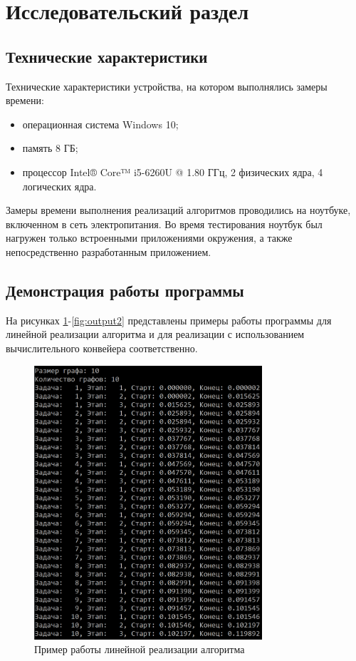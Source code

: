 \section{Исследовательский раздел \hfill}
\vspace{\baselineskip}


\subsection{Технические характеристики}

Технические характеристики устройства, на котором выполнялись замеры времени:

\begin{itemize}[label=---]
	\item операционная система Windows 10;
	\item память 8 ГБ;
	\item процессор Intel® Core™ i5-6260U @ 1.80 ГГц, 2 физических ядра, 4 логических ядра.
\end{itemize}

Замеры времени выполнения реализаций алгоритмов проводились на ноутбуке, включенном в сеть электропитания. Во время тестирования ноутбук был нагружен только встроенными приложениями окружения, а также непосредственно разработанным приложением.

\subsection{Демонстрация работы программы}

На рисунках \ref{fig:output1}-\ref{fig:output2} представлены примеры работы программы для линейной реализации алгоритма и для реализации с использованием вычислительного конвейера соответственно.
\clearpage

\begin{figure}[h!btp]
	\centering
	\includegraphics[width=240pt]{inc/output1.png}
	\caption{Пример работы линейной реализации алгоритма}
	\label{fig:output1}	
\end{figure}

